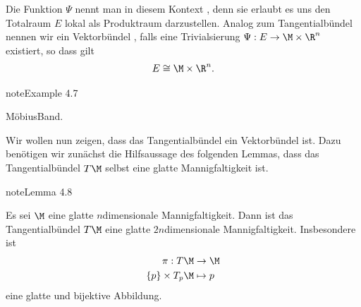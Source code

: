 \documentclass[letterpaper,10pt,english]{jupyterBook}
\begin{document}
\sphinxAtStartPar
Die Funktion \(\Psi\) nennt man in diesem Kontext , denn sie erlaubt es uns den Totalraum \(E\) lokal als Produktraum darzustellen.
Analog zum Tangentialbündel nennen wir ein Vektorbündel , falls eine Trivialsierung \(\Psi:E\to \M\times\R^n\) existiert, so dass gilt
\begin{equation*}
\begin{split}E \cong \M\times\R^n.\end{split}
\end{equation*}\label{manifolds/tangential:example-26}
\begin{sphinxadmonition}{note}{Example 4.7}



\sphinxAtStartPar
Möbius\sphinxhyphen{}Band.
\end{sphinxadmonition}

\sphinxAtStartPar
Wir wollen nun zeigen, dass das Tangentialbündel ein Vektorbündel ist.
Dazu benötigen wir zunächst die Hilfsaussage des folgenden Lemmas, dass das Tangentialbündel \(T\M\) selbst eine glatte Mannigfaltigkeit ist.
\label{manifolds/tangential:lem:tanman}
\begin{sphinxadmonition}{note}{Lemma 4.8}



\sphinxAtStartPar
Es sei \(\M\) eine glatte \(n\)\sphinxhyphen{}dimensionale Mannigfaltigkeit.
Dann ist das Tangentialbündel \(T\M\) eine glatte \(2n\)\sphinxhyphen{}dimensionale Mannigfaltigkeit.
Insbesondere ist
\begin{equation*}
\begin{split}\pi:T\M &\to \M\\
\{p\}\times T_p\M &\mapsto p\end{split}
\end{equation*}
\sphinxAtStartPar
eine glatte und bijektive Abbildung.
\end{sphinxadmonition}
\end{document}
